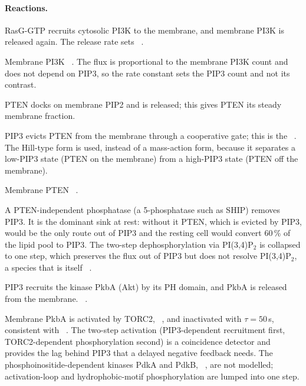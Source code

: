 \paragraph{Reactions.}
\begin{description}\itemsep0pt
\item[4.1/4.2] RasG-GTP recruits cytosolic PI3K to the membrane, and membrane PI3K is released again. The release rate sets ~\cite{huang2003}.
\item[4.3] Membrane PI3K ~\cite{huang2003}. The flux is proportional to the membrane PI3K count and does not depend on PIP3, so the rate constant sets the PIP3 count and not its contrast.
\item[4.4/4.5] PTEN docks on membrane PIP2 and is released; this gives PTEN its steady membrane fraction.
\item[4.6c] PIP3 evicts PTEN from the membrane through a cooperative gate; this is the ~\cite{matsuoka2018}. The Hill-type form is used, instead of a mass-action form, because it separates a low-PIP3 state (PTEN on the membrane) from a high-PIP3 state (PTEN off the membrane).
\item[4.7] Membrane PTEN ~\cite{iijima2002,huang2003}.
\item[4.8] A PTEN-independent phosphatase (a 5-phosphatase such as SHIP) removes PIP3. It is the dominant sink at rest: without it PTEN, which is evicted by PIP3, would be the only route out of PIP3 and the resting cell would convert 60\,\% of the lipid pool to PIP3. The two-step dephosphorylation via PI(3,4)P$_2$ is collapsed to one step, which preserves the flux out of PIP3 but does not resolve PI(3,4)P$_2$, a species that is itself ~\cite{li2018}.
\item[4.10/4.11] PIP3 recruits the kinase PkbA (Akt) by its PH domain, and PkbA is released from the membrane. ~\cite{meili1999}.
\item[4.12/4.13] Membrane PkbA is activated by TORC2, ~\cite{kamimura2008}, and inactivated with $\tau=50$\,s, consistent with ~\cite{meili1999}. The two-step activation (PIP3-dependent recruitment first, TORC2-dependent phosphorylation second) is a coincidence detector and provides the lag behind PIP3 that a delayed negative feedback needs. The phosphoinositide-dependent kinases PdkA and PdkB, ~\cite{kamimura2010}, are not modelled; activation-loop and hydrophobic-motif phosphorylation are lumped into one step.

\end{description}
